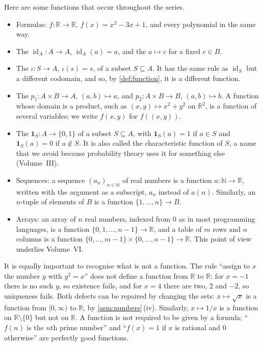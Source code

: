 Here are some functions that occur throughout the series.
\begin{itemize}
\item Formulas: $f\colon\mathbb R\to\mathbb R$, $f(x)=x^2-3x+1$, and every polynomial in the same way.
\item The  $\operatorname{id}_A\colon A\to A$, $\operatorname{id}_A(a)=a$, and the  $a\mapsto c$ for a fixed $c\in B$.
\item The  $\iota\colon S\to A$, $\iota(s)=s$, of a subset $S\subseteq A$. It has the same rule as $\operatorname{id}_S$ but a different codomain, and so, by \cref{def:function}, it is a different function.
\item The  $p_1\colon A\times B\to A$, $(a,b)\mapsto a$, and $p_2\colon A\times B\to B$, $(a,b)\mapsto b$. A function whose domain is a product, such as $(x,y)\mapsto x^2+y^2$ on $\mathbb R^2$, is a function of several variables; we write $f(x,y)$ for $f((x,y))$.
\item The  $\mathbf 1_S\colon A\to\{0,1\}$ of a subset $S\subseteq A$, with $\mathbf 1_S(a)=1$ if $a\in S$ and $\mathbf 1_S(a)=0$ if $a\notin S$. It is also called the characteristic function of $S$, a name that we avoid because probability theory uses it for something else (Volume~III).
\item Sequences: a sequence $(a_n)_{n\in\mathbb N}$ of real numbers is a function $a\colon\mathbb N\to\mathbb R$, written with the argument as a subscript, $a_n$ instead of $a(n)$. Similarly, an $n$-tuple of elements of $B$ is a function $\{1,\ldots,n\}\to B$.
\item Arrays: an array of $n$ real numbers, indexed from $0$ as in most programming languages, is a function $\{0,1,\ldots,n-1\}\to\mathbb R$, and a table of $m$ rows and $n$ columns is a function $\{0,\ldots,m-1\}\times\{0,\ldots,n-1\}\to\mathbb R$. This point of view underlies Volume~VI.
\end{itemize}

It is equally important to recognise what is not a function. The rule ``assign to $x$ the number $y$ with $y^2=x$'' does not define a function from $\mathbb R$ to $\mathbb R$: for $x=-1$ there is no such $y$, so existence fails, and for $x=4$ there are two, $2$ and $-2$, so uniqueness fails. Both defects can be repaired by changing the sets: $x\mapsto\sqrt x$ is a function from $[0,\infty)$ to $\mathbb R$, by \cref{asm:numbers}\,(iv). Similarly, $x\mapsto1/x$ is a function on $\mathbb R\setminus\{0\}$ but not on $\mathbb R$. A function is not required to be given by a formula; ``$f(n)$ is the $n$th prime number'' and ``$f(x)=1$ if $x$ is rational and $0$ otherwise'' are perfectly good functions.

